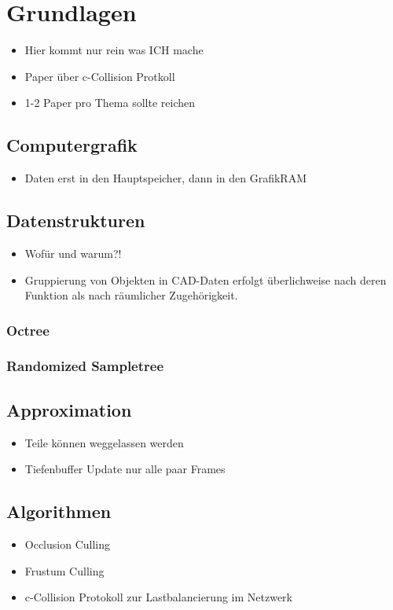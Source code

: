 \chapter{Grundlagen}

\begin{itemize}
 \item Hier kommt nur rein was ICH mache
 
 \item Paper über c-Collision Protkoll
 \item 1-2 Paper pro Thema sollte reichen
\end{itemize}


\section{Computergrafik}
\begin{itemize}
 \item Daten erst in den Hauptspeicher, dann in den GrafikRAM
\end{itemize}

\section{Datenstrukturen}
\begin{itemize}
 \item Wofür und warum?!
 \item Gruppierung von Objekten in CAD-Daten erfolgt überlichweise nach deren Funktion als nach räumlicher Zugehörigkeit.
\end{itemize}

\subsection{Octree}
\subsection{Randomized Sampletree}
\section{Approximation}
\begin{itemize}
 \item Teile können weggelassen werden
 \item Tiefenbuffer Update nur alle paar Frames
\end{itemize}

\section{Algorithmen}
\begin{itemize}
 \item Occlusion Culling
 \item Frustum Culling
 \item c-Collision Protokoll zur Lastbalancierung im Netzwerk
\end{itemize}

